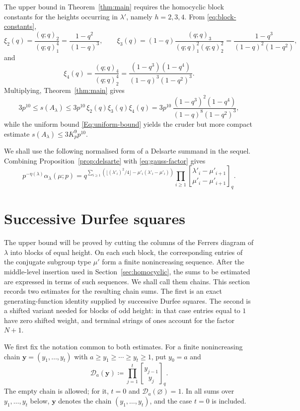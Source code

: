 \documentclass[a4paper,11pt,reqno]{amsart}
\theoremstyle{plain}
\theoremstyle{remark}
\numberwithin{equation}{section}
\newcommand{\qgauss}[2]{\genfrac{[}{]}{0pt}{}{#1}{#2}_q}
\renewcommand{\leq}{\leqslant}
\renewcommand{\geq}{\geqslant}
\renewcommand{\emptyset}{\varnothing}
\begin{document}
The upper bound in Theorem~\ref{thm:main} requires the homocyclic
block constants for the heights occurring in $\lambda'$, namely
$h=2,3,4$. From \eqref{eq:block-constants},
\[
        \xi_2(q)
        = \frac{(q;q)_2}{(q;q)_1^4}
        = \frac{1-q^2}{(1-q)^3},
        \qquad
        \xi_3(q)
        = (1-q)\frac{(q;q)_3}{(q;q)_1^2(q;q)_2^2}
        = \frac{1-q^3}{(1-q)^2(1-q^2)},
\]
and
\[
        \xi_4(q)
        = \frac{(q;q)_4}{(q;q)_2^4}
        = \frac{(1-q^3)(1-q^4)}{(1-q)^3(1-q^2)^3}.
\]
Multiplying, Theorem~\ref{thm:main} gives
\[
        3p^{10}
        \leq s(A_\lambda)
        \leq
        3p^{10}\,\xi_2(q)\xi_3(q)\xi_4(q)
        =
        3p^{10}\,
        \frac{(1-q^3)^2(1-q^4)}{(1-q)^8(1-q^2)^3},
\]
while the uniform bound \eqref{Eq:uniform-bound} yields the cruder but more compact estimate
$s(A_\lambda)\leq 3K_p^9p^{10}$.

We shall use the following normalised form of a Delsarte summand in the sequel.
Combining Proposition~\ref{prop:delsarte} with \eqref{eq:gauss-factor} gives
\begin{equation}\label{eq:normalised-delsarte-summand}
        p^{-\eta(\lambda)}\alpha_\lambda(\mu;p)
        =
        q^{\sum_{i\geq 1}(\lfloor(\lambda'_i)^2/4\rfloor
        -\mu'_i(\lambda'_i-\mu'_i))}
        \prod_{i\geq 1}
        \qgauss{\lambda'_i-\mu'_{i+1}}{\mu'_i-\mu'_{i+1}}.
\end{equation}



\section{Successive Durfee squares}
\label{sec:durfee}

The upper bound will be proved by cutting the columns of the Ferrers diagram of
$\lambda$ into blocks of equal height. 
On each such block, the corresponding entries of the conjugate subgroup type
$\mu'$ form a finite nonincreasing sequence. After the middle-level insertion
used in Section~\ref{sec:homocyclic}, the sums to be estimated are expressed
in terms of such sequences. We shall call
them chains. This section records two estimates for the resulting chain sums.
The first is an exact generating-function identity supplied by successive
Durfee squares. The second is a shifted variant needed for blocks of odd height:
in that case entries equal to $1$ have zero shifted weight, and terminal strings
of ones account for the factor $N+1$.

We first fix the notation common to both estimates. For a finite nonincreasing
chain $\mathbf y=(y_1,\ldots,y_t)$ with
$a\geq y_1\geq\cdots\geq y_t\geq 1$, put $y_0=a$ and
\[
        \mathcal D_a(\mathbf y) \coloneqq
        \prod_{j=1}^t\qgauss{y_{j-1}}{y_j}.
\]
The empty chain is allowed; for it, $t=0$ and $\mathcal D_a(\emptyset)=1$. In
all sums over $y_1,\ldots,y_t$ below, $\mathbf y$ denotes the chain
$(y_1,\ldots,y_t)$, and the case $t=0$ is included.
\end{document}
